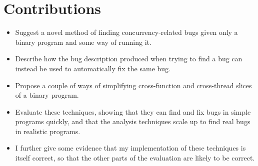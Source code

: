 \section{Contributions}

\begin{itemize}
\item
  Suggest a novel method of finding concurrency-related bugs given
  only a binary program and some way of running it.
\item
  Describe how the bug description produced when trying to find a bug
  can instead be used to automatically fix the same bug.
\item
  Propose a couple of ways of simplifying cross-function and
  cross-thread slices of a binary program.
\item
  Evaluate these techniques, showing that they can find and fix bugs
  in simple programs quickly, and that the analysis techniques
   scale up to find real bugs in realistic
  programs.
\item
  I further give some evidence that my implementation of these
  techniques is itself correct, so that the other parts of the
  evaluation are likely to be correct.
\end{itemize}

